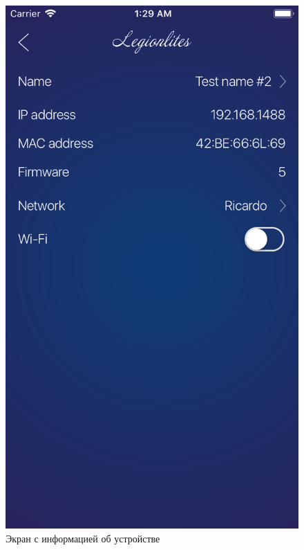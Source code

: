 \begin{figure}[H]
\centering
	\includegraphics[scale=0.2]{figures/userGuide/deviceInfo.png}
	\caption{Экран с информацией об устройстве}
	\label{fig:develop:userGuide:deviceInfo}
\end{figure}

